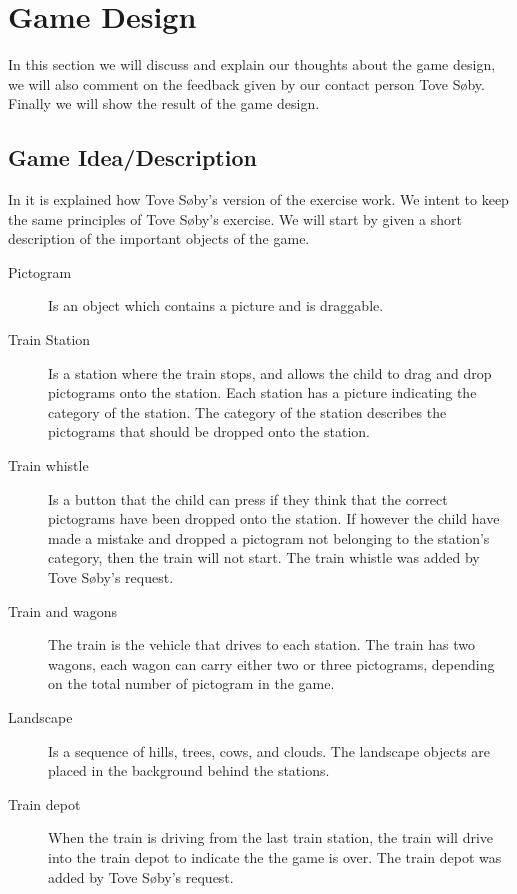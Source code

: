 \section{Game Design}
In this section we will discuss and explain our thoughts about the game design, we will also comment on the feedback given by our contact person Tove Søby. Finally we will show the result of the game design.
\subsection{Game Idea/Description}\label{sec:gameidea}
In  it is explained how Tove Søby's version of the exercise work. We intent to keep the same principles of Tove Søby's exercise. We will start by given a short description of the important objects of the game.
\begin{description}
\item[Pictogram] Is an object which contains a picture and is draggable.
\item[Train Station] Is a station where the train stops, and allows the child to drag and drop pictograms onto the station. Each station has a picture indicating the category of the station. The category of the station describes the pictograms that should be dropped onto the station.  

\item[Train whistle] Is a button that the child can press if they think that the correct pictograms have been dropped onto the station. If however the child have made a mistake and dropped a pictogram not belonging to the station's category, then the train will not start. The train whistle was added by Tove Søby's request.

\item[Train and wagons] The train is the vehicle that drives  to each station. The train has two wagons, each wagon can carry either two or three pictograms, depending on the total number of pictogram in the game.

\item[Landscape] Is a sequence of hills, trees, cows, and clouds. The landscape objects are placed in the background behind the stations.

\item[Train depot] When the train is driving from the last train station, the train will drive into the train depot to indicate the the game is over. The train depot was added by Tove Søby's request.
\end{description}
